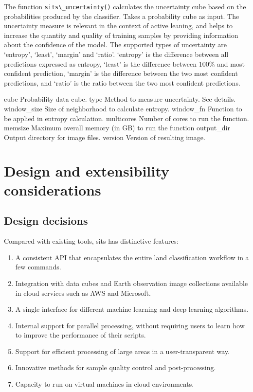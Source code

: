 \documentclass[
  11pt,
]{report}
\newcommand{\passthrough}[1]{#1}
\providecommand{\tightlist}{%
  \setlength{\itemsep}{0pt}\setlength{\parskip}{0pt}}
\begin{document}
The function \passthrough{\lstinline!sits\_uncertainty()!} calculates
the uncertainty cube based on the probabilities produced by the
classifier. Takes a probability cube as input. The uncertainty measure
is relevant in the context of active leaning, and helps to increase the
quantity and quality of training samples by providing information about
the confidence of the model. The supported types of uncertainty are
`entropy', `least', `margin' and `ratio'. `entropy' is the difference
between all predictions expressed as entropy, `least' is the difference
between 100\% and most confident prediction, `margin' is the difference
between the two most confident predictions, and `ratio' is the ratio
between the two most confident predictions.

cube Probability data cube. type Method to measure uncertainty. See
details. window\_size Size of neighborhood to calculate entropy.
window\_fn Function to be applied in entropy calculation. multicores
Number of cores to run the function. memsize Maximum overall memory (in
GB) to run the function output\_dir Output directory for image files.
version Version of resulting image.

\hypertarget{design-and-extensibility-considerations}{%
\chapter*{Design and extensibility
considerations}\label{design-and-extensibility-considerations}}

\hypertarget{design-decisions}{%
\section{Design decisions}\label{design-decisions}}

Compared with existing tools, sits has distinctive features:

\begin{enumerate}
\def\labelenumi{\arabic{enumi}.}
\tightlist
\item
  A consistent API that encapsulates the entire land classification
  workflow in a few commands.
\item
  Integration with data cubes and Earth observation image collections
  available in cloud services such as AWS and Microsoft.
\item
  A single interface for different machine learning and deep learning
  algorithms.
\item
  Internal support for parallel processing, without requiring users to
  learn how to improve the performance of their scripts.
\item
  Support for efficient processing of large areas in a user-transparent
  way.
\item
  Innovative methods for sample quality control and post-processing.
\item
  Capacity to run on virtual machines in cloud environments.
\end{enumerate}
\end{document}
